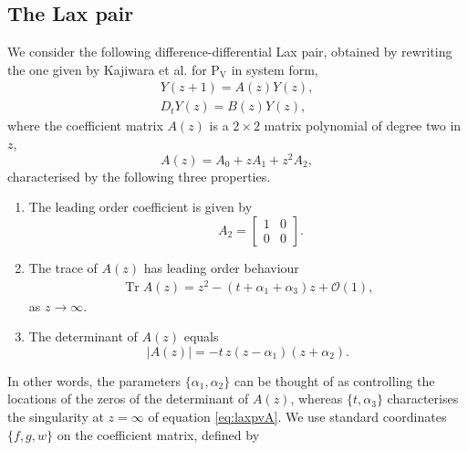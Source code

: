 \documentclass[a4paper,reqno]{amsart}
\numberwithin{equation}{section}
\numberwithin{figure}{section}
\theoremstyle{remark}
\newcommand\Pfive{\textrm{P}_{\textrm{V}}}
\begin{document}
\subsection{The Lax pair} \label{subsect:linP5}
We consider the following difference-differential Lax pair, obtained by rewriting the one given by Kajiwara et al. \cite{KNY2017} for $\Pfive$ in system form,
\begin{subequations}\label{eq:laxpv}
\begin{align}
    Y(z+1)=A(z)Y(z),\label{eq:laxpvA}\\
    D_t Y(z)=B(z)Y(z),\label{eq:laxpvB}
\end{align}
\end{subequations}
where the coefficient matrix $A(z)$ is a $2\times 2$ matrix polynomial of degree two in $z$,
\begin{equation}\label{eq:pvAseries}
        A(z)=A_0+z A_1+z^2A_2,
    \end{equation}
    characterised by the following three properties.
\begin{enumerate}[label=(\roman*)]
\item The leading order coefficient is given by
\begin{equation*}
    \qquad A_2=\begin{bmatrix}
            1 & 0\\
            0 & 0
        \end{bmatrix}.
\end{equation*}
    \item The trace of $A(z)$ has leading order behaviour
   \begin{equation}\label{eq:traceinfpvKNY}
    \begin{aligned}
     \operatorname{Tr}A(z)=z^2-(t+\alpha_1+\alpha_3)z+\mathcal{O}(1),
    \end{aligned}
   \end{equation}
    as $z\rightarrow \infty$.
    \item The determinant of $A(z)$ equals
\begin{equation}\label{eq:coefmatrixdetpvKNY}
    |A(z)|=-t\,z(z-\alpha_1)(z+\alpha_2).
\end{equation}
\end{enumerate}
In other words, the parameters $\{\alpha_1,\alpha_2\}$ can be thought of as controlling the locations of the zeros of the determinant of $A(z)$, whereas $\{t,\alpha_3\}$ characterises the singularity at $z=\infty$ of equation \eqref{eq:laxpvA}. We use standard coordinates $\{f,g,w\}$ on the coefficient matrix, defined by 
\end{document}

